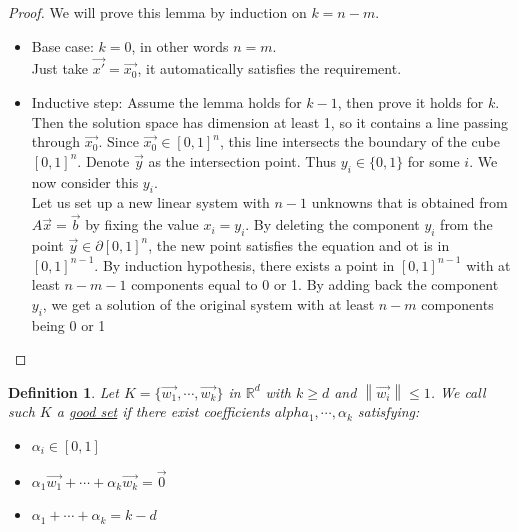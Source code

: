 \documentclass{article}
\newtheorem{definition}{Definition}[section]
\newcommand{\R}{\mathbb{R}}
\newcommand{\norm}[1]{\left\lVert #1 \right\rVert}
\begin{document}
\begin{proof}
    We will prove this lemma by induction on $k=n-m$.
    \begin{itemize}
        \item Base case: $k=0$, in other words $n=m$.\\
        Just take $\vec{x'}=\vec{x_0}$, it automatically satisfies the requirement.
        \item Inductive step: Assume the lemma holds for $k-1$, then prove it holds for $k$.\\
        Then the solution space has dimension at least 1, so it contains a line passing through $\vec{x_0}$. 
        Since $\vec{x_0}\in [0,1]^n$, this line intersects the boundary of the cube $[0,1]^n$. Denote $\vec{y}$ as the intersection point. Thus $y_i\in\{0,1\}$ for some $i$. We now consider this $y_i$.\\
        Let us set up a new linear system with $n-1$ unknowns that is obtained from $A\vec{x}=\vec{b}$ by fixing the value $x_i=y_i$. 
        By deleting the component $y_i$ from the point $\vec{y}\in \partial[0,1]^n$, the new point satisfies the equation and ot is in $[0,1]^{n-1}$. 
        By induction hypothesis, there exists a point in $[0,1]^{n-1}$ with at least $n-m-1$ components equal to 0 or 1. By adding back the component $y_i$, we get a solution of the original system with at least $n-m$ components being 0 or 1
    \end{itemize}
\end{proof}

\begin{definition}
     Let $K=\{\vec{w_1},\cdots,\vec{w_k}\}$ in $\R^d$ with $k\geq d$ and $\norm{\vec{w_i}}\leq1$. We call such $K$ a \underline{good set} if there exist coefficients $alpha_1,\cdots,\alpha_k$ satisfying:
    \begin{itemize}
        \item $\alpha_i\in [0,1]$
        \item $\alpha_1\vec{w_1}+\cdots+\alpha_k\vec{w_k}=\vec{0}$
        \item $\alpha_1+\cdots+\alpha_k=k-d$
    \end{itemize}
\end{definition}
\end{document}
